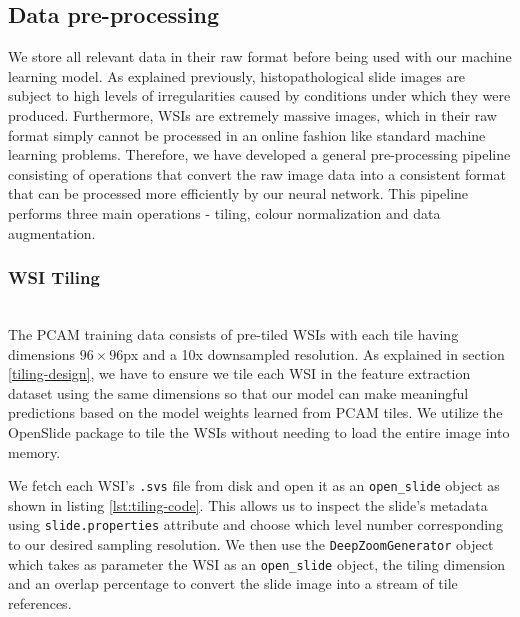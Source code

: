 \documentclass{l4proj}
\begin{document}
\subsection{Data pre-processing}
We store all relevant data in their raw format before being used with our machine learning model. As explained previously, histopathological slide images are subject to high levels of irregularities caused by conditions under which they were produced. Furthermore, WSIs are extremely massive images, which in their raw format simply cannot be processed in an online fashion like standard machine learning problems. Therefore, we have developed a general pre-processing pipeline consisting of  operations that convert the raw image data into a consistent format that can be processed more efficiently by our neural network. This pipeline performs three main operations - tiling, colour normalization and data augmentation. 
\\
\subsubsection{WSI Tiling}\hfill\\
The PCAM training data consists of pre-tiled WSIs with each tile having dimensions \(96 \times 96\)px and a 10x downsampled resolution. As explained in section \ref{tiling-design}, we have to ensure we tile each WSI in the feature extraction dataset using the same dimensions so that our model can make meaningful predictions based on the model weights learned from PCAM tiles. We utilize the OpenSlide package to tile the WSIs without needing to load the entire image into memory. 

We fetch each WSI's \texttt{.svs} file from disk and open it as an \texttt{open\_slide} object as shown in listing \ref{lst:tiling-code}. This allows us to inspect the slide's metadata using \texttt{slide.properties} attribute and choose which level number corresponding to our desired sampling resolution. We then use the \texttt{DeepZoomGenerator} object which takes as parameter the WSI as an \texttt{open\_slide} object, the tiling dimension and an overlap percentage to convert the slide image into a stream of tile references. 
\end{document}
